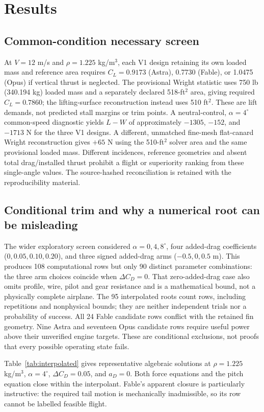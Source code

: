 \documentclass[11pt,a4paper]{article}
\begin{document}
\section{Results}
\subsection{Common-condition necessary screen}
At $V=12$ m/s and $\rho=1.225$ kg/m$^3$, each V1 design retaining its own loaded mass and reference area requires $C_L=0.9173$ (Astra), 0.7730 (Fable), or 1.0475 (Opus) if vertical thrust is neglected. The provisional Wright statistic uses 750 lb (340.194 kg) loaded mass and a separately declared 518-ft$^2$ area, giving required $C_L=0.7860$; the lifting-surface reconstruction instead uses 510 ft$^2$. These are lift demands, not predicted stall margins or trim points. A neutral-control, $\alpha=4^\circ$ common-speed diagnostic yields $L-W$ of approximately $-1305$, $-152$, and $-1713$ N for the three V1 designs. A different, unmatched fine-mesh flat-canard Wright reconstruction gives $+65$ N using the 510-ft$^2$ solver area and the same provisional loaded mass. Different incidences, reference geometries and absent total drag/installed thrust prohibit a flight or superiority ranking from these single-angle values. The source-hashed reconciliation is retained with the reproducibility material.

\subsection{Conditional trim and why a numerical root can be misleading}
The wider exploratory screen considered $\alpha=0,4,8^\circ$, four added-drag coefficients ($0,0.05,0.10,0.20$), and three signed added-drag arms ($-0.5,0,0.5$ m). This produces 108 computational rows but only 90 distinct parameter combinations: the three arm choices coincide when $\Delta C_D=0$. That zero-added-drag case also omits profile, wire, pilot and gear resistance and is a mathematical bound, not a physically complete airplane. The 95 interpolated roots count rows, including repetitions and nonphysical bounds; they are neither independent trials nor a probability of success. All 24 Fable candidate rows conflict with the retained fin geometry. Nine Astra and seventeen Opus candidate rows require useful power above their unverified engine targets. These are conditional exclusions, not proofs that every possible operating state fails.

Table~\ref{tab:interpolated} gives representative algebraic solutions at $\rho=1.225$ kg/m$^3$, $\alpha=4^\circ$, $\Delta C_D=0.05$, and $a_D=0$. Both force equations and the pitch equation close within the interpolant. Fable's apparent closure is particularly instructive: the required tail motion is mechanically inadmissible, so its row cannot be labelled feasible flight.
\end{document}
